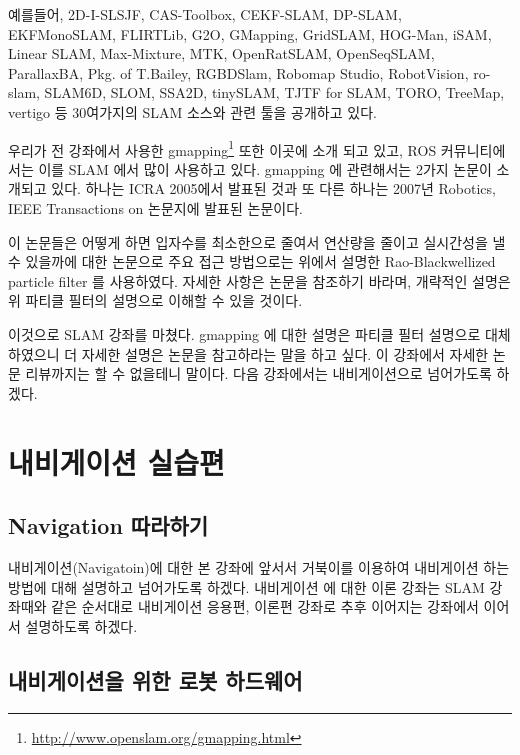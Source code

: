 예를들어, 2D-I-SLSJF, CAS-Toolbox, CEKF-SLAM, DP-SLAM, EKFMonoSLAM, FLIRTLib, G2O, GMapping, GridSLAM, HOG-Man, iSAM, Linear SLAM, Max-Mixture, MTK, OpenRatSLAM, OpenSeqSLAM, ParallaxBA, Pkg. of T.Bailey, RGBDSlam, Robomap Studio, RobotVision, ro-slam, SLAM6D, SLOM, SSA2D, tinySLAM, TJTF for SLAM, TORO, TreeMap, vertigo 등 30여가지의 SLAM 소스와 관련 툴을 공개하고 있다.

우리가 전 강좌에서 사용한 gmapping\footnote{\url{http://www.openslam.org/gmapping.html}} 또한 이곳에 소개 되고 있고, ROS 커뮤니티에서는 이를 SLAM 에서 많이 사용하고 있다. gmapping 에 관련해서는 2가지 논문\cite{grisetti2005improving,grisetti2007improved}이 소개되고 있다. 하나는 ICRA 2005에서 발표된 것과 또 다른 하나는 2007년 Robotics, IEEE Transactions on 논문지에 발표된 논문이다.

이 논문들은 어떻게 하면 입자수를 최소한으로 줄여서 연산량을 줄이고 실시간성을 낼 수 있을까에 대한 논문으로 주요 접근 방법으로는 위에서 설명한 Rao-Blackwellized particle filter 를 사용하였다. 자세한 사항은 논문을 참조하기 바라며, 개략적인 설명은 위 파티클 필터의 설명으로 이해할 수 있을 것이다.

이것으로 SLAM 강좌를 마쳤다. gmapping 에 대한 설명은 파티클 필터 설명으로 대체하였으니 더 자세한 설명은 논문을 참고하라는 말을 하고 싶다. 이 강좌에서 자세한 논문 리뷰까지는 할 수 없을테니 말이다. 다음 강좌에서는 내비게이션으로 넘어가도록 하겠다.

\section{내비게이션 실습편}

\subsection{Navigation 따라하기}

내비게이션(Navigatoin)에 대한 본 강좌에 앞서서 거북이를 이용하여 내비게이션 하는 방법에 대해 설명하고 넘어가도록 하겠다. 내비게이션 에 대한 이론 강좌는 SLAM 강좌때와 같은 순서대로 내비게이션 응용편, 이론편 강좌로 추후 이어지는 강좌에서 이어서 설명하도록 하겠다.

\subsection{내비게이션을 위한 로봇 하드웨어}

